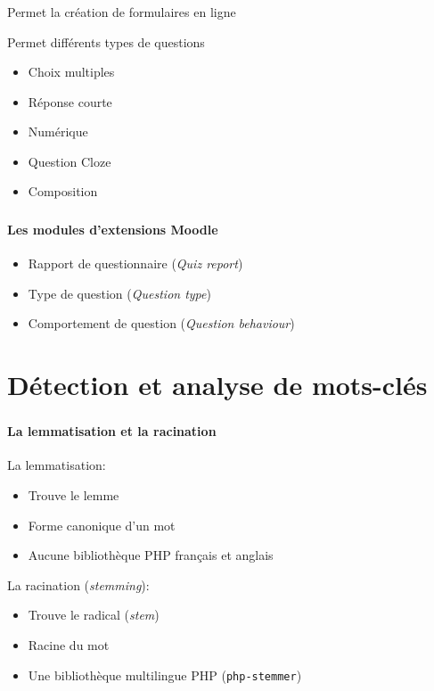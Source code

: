 \documentclass{beamer}
\begin{document}
  \begin{frame}
  \frametitle{\insertsection}
  
  \begin{block}{Permet la  cr\'eation de formulaires en ligne}
  \end{block}
  
  \medskip
  
  \begin{block}{Permet diff\'erents types de questions}
  \begin{itemize}
    \item Choix multiples
    \item R\'eponse courte
    \item Num\'erique
    \item Question Cloze
    \item Composition
  \end{itemize}
  \end{block}
  \end{frame}
  
  \begin{frame}
  \frametitle{\insertsection}
  \framesubtitle{Les modules d'extensions Moodle}
  \begin{itemize}
    \item Rapport de questionnaire (\textit{Quiz report})
    \item Type de question (\textit{Question type})
    \item Comportement de question (\textit{Question behaviour})
  \end{itemize}
  \end{frame}
  
  \section[Mots-cl\'es]{D\'etection et analyse de mots-cl\'es}
  \begin{frame}
  \frametitle{\insertsection}
  \framesubtitle{La lemmatisation et la racination}
  La lemmatisation:
  \begin{itemize}
    \item Trouve le lemme
    \item Forme canonique d'un mot
    \item Aucune biblioth\`eque PHP fran\c{c}ais et anglais
  \end{itemize}
  
  \medskip
  
  La racination (\textit{stemming}):
  \begin{itemize}
    \item Trouve le radical (\textit{stem})
    \item Racine du mot
    \item Une biblioth\`eque multilingue PHP (\texttt{php-stemmer})
  \end{itemize}
  \end{frame}
  
\end{document}
